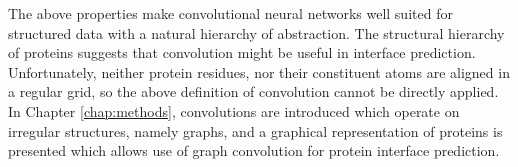 The above properties make convolutional neural networks well suited for structured data with a natural hierarchy of abstraction.
The structural hierarchy of proteins suggests that convolution might be useful in interface prediction.
Unfortunately, neither protein residues, nor their constituent atoms are aligned in a regular grid, so the above definition of convolution cannot be directly applied. 
In Chapter \ref{chap:methods}, convolutions are introduced which operate on irregular structures, namely graphs, and a graphical representation of proteins is presented which allows use of graph convolution for protein interface prediction.